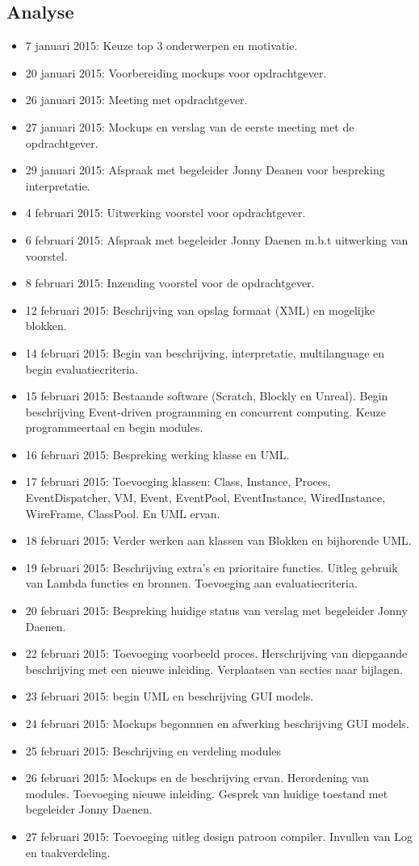 \documentclass[]{article}
\begin{document}
\subsection{Analyse}
\begin{itemize}
\item 7 januari 2015: Keuze top 3 onderwerpen en motivatie.
\item 20 januari 2015: Voorbereiding mockups voor opdrachtgever.
\item 26 januari 2015: Meeting met opdrachtgever.
\item 27 januari 2015: Mockups en verslag van de eerste meeting met de opdrachtgever.
\item 29 januari 2015: Afspraak met begeleider Jonny Deanen voor bespreking interpretatie.
\item 4 februari 2015: Uitwerking voorstel voor opdrachtgever.
\item 6 februari 2015: Afspraak met begeleider Jonny Daenen m.b.t uitwerking van voorstel.
\item 8 februari 2015: Inzending voorstel voor de opdrachtgever.
\item 12 februari 2015: Beschrijving van opslag formaat (XML) en mogelijke blokken.
\item 14 februari 2015: Begin van beschrijving, interpretatie, multilanguage en begin evaluatiecriteria.
\item 15 februari 2015: Bestaande software (Scratch, Blockly en Unreal). Begin beschrijving Event-driven programming en concurrent computing. Keuze programmeertaal en begin modules.
\item 16 februari 2015: Bespreking werking klasse en UML.
\item 17 februari 2015:  Toevoeging klassen: Class, Instance, Proces, EventDispatcher, VM, Event, EventPool, EventInstance, WiredInstance, WireFrame, ClassPool. En UML ervan.
\item 18 februari 2015: Verder werken aan klassen van Blokken en bijhorende UML.
\item 19 februari 2015: Beschrijving extra's en prioritaire functies. Uitleg gebruik van Lambda functies en bronnen. Toevoeging aan evaluatiecriteria.
\item 20 februari 2015: Bespreking huidige status van verslag met begeleider Jonny Daenen.
\item 22 februari 2015: Toevoeging voorbeeld proces. Herschrijving van diepgaande beschrijving met een nieuwe inleiding. Verplaatsen van secties naar bijlagen.
\item 23 februari 2015: begin UML en beschrijving GUI models.
\item 24 februari 2015: Mockups begonnnen en afwerking beschrijving GUI models.
\item 25 februari 2015: Beschrijving en verdeling modules
\item 26 februari 2015: Mockups en de beschrijving ervan. Herordening van modules. Toevoeging nieuwe inleiding. Gesprek van huidige toestand met begeleider Jonny Daenen.
\item 27 februari 2015: Toevoeging uitleg design patroon compiler. Invullen van Log en taakverdeling.
\end{itemize}
\end{document}
